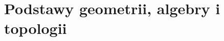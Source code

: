 \documentclass[11pt,a4paper]{report}
\begin{document}


\part{Podstawy geometrii, algebry i topologii}












\end{document}

